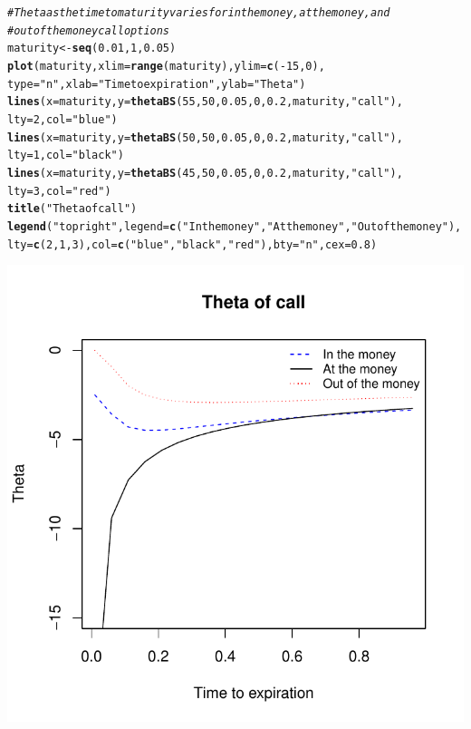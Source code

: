 \documentclass{article}\usepackage[]{graphicx}\usepackage[]{color}
\makeatletter
\def\maxwidth{ %
  \ifdim\Gin@nat@width>\linewidth
    \linewidth
  \else
    \Gin@nat@width
  \fi
}
\newcommand{\hlstr}[1]{\textcolor[rgb]{0.192,0.494,0.8}{#1}}%
\newcommand{\hlcom}[1]{\textcolor[rgb]{0.678,0.584,0.686}{\textit{#1}}}%
\newcommand{\hlkwd}[1]{\textcolor[rgb]{0.737,0.353,0.396}{\textbf{#1}}}%
\newenvironment{kframe}{%
 \def\at@end@of@kframe{}%
 \ifinner\ifhmode%
  \def\at@end@of@kframe{\end{minipage}}%
  \begin{minipage}{\columnwidth}%
 \fi\fi%
 \def\FrameCommand##1{\hskip\@totalleftmargin \hskip-\fboxsep
 \colorbox{shadecolor}{##1}\hskip-\fboxsep
     \hskip-\linewidth \hskip-\@totalleftmargin \hskip\columnwidth}%
 \MakeFramed {\advance\hsize-\width
   \@totalleftmargin\z@ \linewidth\hsize
   \@setminipage}}%
 {\par\unskip\endMakeFramed%
 \at@end@of@kframe}
\newenvironment{knitrout}{}{} %
\makeatother
\begin{document}
\begin{knitrout}
\color{fgcolor}\begin{kframe}
\begin{alltt}
\hlcom{# Theta as the time to maturity varies for in the money, at the money, and}
\hlcom{# out of the money call options}
maturity <- \hlkwd{seq}(0.01, 1, 0.05)
\hlkwd{plot}(maturity, xlim = \hlkwd{range}(maturity), ylim = \hlkwd{c}(-15,0), 
     type=\hlstr{"n"}, xlab=\hlstr{"Time to expiration"}, ylab=\hlstr{"Theta"})
\hlkwd{lines}(x = maturity, y = \hlkwd{thetaBS}(55, 50, 0.05, 0, 0.2, maturity, \hlstr{"call"}), 
      lty=2, col=\hlstr{"blue"})
\hlkwd{lines}(x = maturity, y = \hlkwd{thetaBS}(50, 50, 0.05, 0, 0.2, maturity, \hlstr{"call"}), 
      lty=1, col=\hlstr{"black"})
\hlkwd{lines}(x = maturity, y = \hlkwd{thetaBS}(45, 50, 0.05, 0, 0.2, maturity, \hlstr{"call"}), 
      lty=3, col=\hlstr{"red"})
\hlkwd{title}(\hlstr{"Theta of call"})
\hlkwd{legend}(\hlstr{"topright"}, legend=\hlkwd{c}(\hlstr{"In the money"}, \hlstr{"At the money"}, \hlstr{"Out of the money"}),
       lty=\hlkwd{c}(2,1,3), col=\hlkwd{c}(\hlstr{"blue"}, \hlstr{"black"}, \hlstr{"red"}), bty=\hlstr{"n"}, cex=0.8)
\end{alltt}
\end{kframe}
\includegraphics[width=\maxwidth]{figure/unnamed-chunk-14} 

\end{knitrout}
\end{document}
